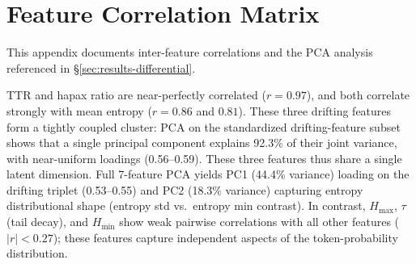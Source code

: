 \section{Feature Correlation Matrix}
\label{sec:appendix-feature-correlation}

This appendix documents inter-feature correlations and the PCA analysis referenced in \S\ref{sec:results-differential}.

\begin{table}[t]
\centering
\caption{Pearson correlation matrix of the seven depth features ($N=27{,}529$).}
\label{tab:feature-corr}
\end{table}

TTR and hapax ratio are near-perfectly correlated ($r=0.97$), and both correlate strongly with mean entropy ($r=0.86$ and $0.81$).
These three drifting features form a tightly coupled cluster: PCA on the standardized drifting-feature subset shows that a single principal component explains 92.3\% of their joint variance, with near-uniform loadings (0.56--0.59). These three features thus share a single latent dimension.
Full 7-feature PCA yields PC1 (44.4\% variance) loading on the drifting triplet (0.53--0.55) and PC2 (18.3\% variance) capturing entropy distributional shape (entropy std vs.\ entropy min contrast).
In contrast, $H_{\max}$, $\tau$ (tail decay), and $H_{\min}$ show weak pairwise correlations with all other features ($|r| < 0.27$); these features capture independent aspects of the token-probability distribution.
